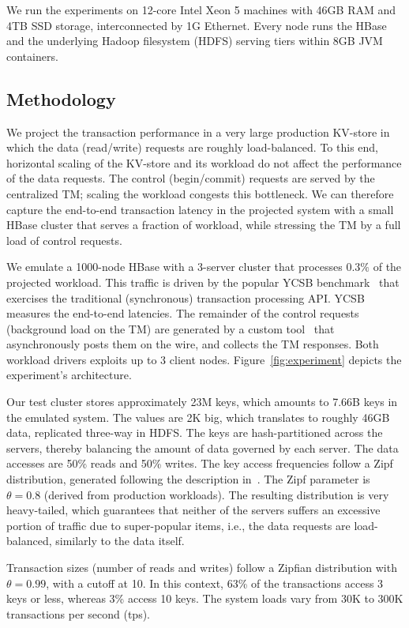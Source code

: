 We run the experiments on 12-core Intel Xeon 5 machines with 46GB RAM and 4TB 
SSD storage, interconnected by 1G Ethernet.  Every node runs the HBase and the underlying 
Hadoop filesystem (HDFS) serving tiers within 8GB JVM containers. 

\subsection{Methodology}
We project the transaction performance in a very large production KV-store in which the data (read/write) 
requests are roughly load-balanced. To this end, horizontal scaling of the KV-store and its workload do not 
affect the performance of the data requests. The control (begin/commit) requests are served by the centralized 
TM; scaling the workload congests this bottleneck. We can therefore capture the end-to-end transaction latency
in the projected system with a small HBase cluster that serves a fraction of workload, while stressing the TM 
by a full load of control requests. 

We emulate a 1000-node HBase with a 3-server cluster that processes $0.3\%$ of the projected workload. 
This traffic is driven by the popular YCSB benchmark~\cite{Cooper:2010:BCS:1807128.1807152} 
that exercises the traditional (synchronous) transaction processing API. YCSB measures the end-to-end latencies.
The remainder of the control requests (background load on the TM) are generated by a custom tool~\cite{Omid2017} 
that asynchronously posts them on the wire, and collects the TM responses. Both workload
drivers exploits up to 3 client nodes. Figure~\ref{fig:experiment} depicts the experiment's architecture. 

Our test cluster stores approximately 23M keys, which amounts to 7.66B keys in the emulated system. 
The values are 2K big, which translates to roughly 46GB data, replicated three-way in HDFS. The keys are hash-partitioned
across the servers, thereby balancing the amount of data governed by each server. The data accesses are 50\% reads and 
50\% writes. The key access frequencies follow a Zipf distribution, generated following the description in~\cite{Gray:1994:QGB:191839.191886}. 
The Zipf parameter is $\theta=0.8$ (derived from production workloads). The resulting distribution is very heavy-tailed, which 
guarantees that neither of the servers suffers an excessive portion of traffic due to super-popular items, i.e., the 
data requests are load-balanced, similarly to the data itself.  

Transaction sizes (number of reads and writes) follow a Zipfian distribution with $\theta=0.99$, with a cutoff at 10. 
In this context, 63\% of the transactions access 3 keys or less, whereas 3\% access 10 keys. The system loads
vary from 30K to 300K transactions per second (tps). 

